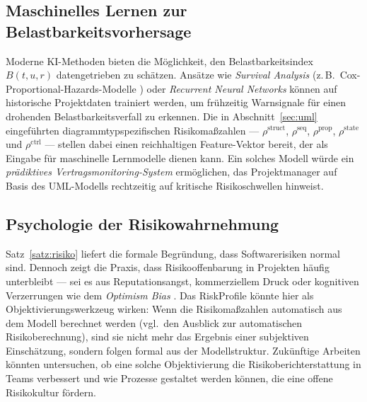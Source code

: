 ﻿\documentclass[a4paper,12pt]{article}
\theoremstyle{definition}
\begin{document}
\subsection{Maschinelles Lernen zur Belastbarkeitsvorhersage}

Moderne KI-Methoden bieten die M\"oglichkeit, den Belastbarkeitsindex $B(t, u, r)$
datengetrieben zu sch\"atzen. Ans\"atze wie \emph{Survival Analysis} (z.\,B.\
Cox-Proportional-Hazards-Modelle \cite{cox1972}) oder \emph{Recurrent Neural Networks}
k\"onnen auf historische Projektdaten trainiert werden, um fr\"uhzeitig Warnsignale
f\"ur einen drohenden Belastbarkeitsverfall zu erkennen. Die in Abschnitt~\ref{sec:uml}
eingef\"uhrten diagrammtypspezifischen Risikoma\ss{}zahlen ---
$\rho^{\mathrm{struct}}$, $\rho^{\mathrm{seq}}$, $\rho^{\mathrm{prop}}$,
$\rho^{\mathrm{state}}$ und $\rho^{\mathrm{ctrl}}$ --- stellen dabei einen
reichhaltigen Feature-Vektor bereit, der als Eingabe f\"ur maschinelle Lernmodelle
dienen kann. Ein solches Modell w\"urde ein
\emph{pr\"adiktives Vertragsmonitoring-System} erm\"oglichen, das Projektmanager
auf Basis des UML-Modells rechtzeitig auf kritische Risikoschwellen hinweist.

\subsection{Psychologie der Risikowahrnehmung}

Satz~\ref{satz:risiko} liefert die formale Begr\"undung, dass Softwarerisiken normal
sind. Dennoch zeigt die Praxis, dass Risikooffenbarung in Projekten h\"aufig unterbleibt
--- sei es aus Reputationsangst, kommerziellem Druck oder kognitiven Verzerrungen wie
dem \emph{Optimism Bias} \cite{weinstein1980}. Das \textsf{RiskProfile} k\"onnte hier
als Objektivierungswerkzeug wirken: Wenn die Risikoma\ss{}zahlen automatisch aus dem
Modell berechnet werden (vgl.\ den Ausblick zur automatischen Risikoberechnung), sind
sie nicht mehr das Ergebnis einer subjektiven Einsch\"atzung, sondern folgen formal aus
der Modellstruktur. Zuk\"unftige Arbeiten k\"onnten untersuchen, ob eine solche
Objektivierung die Risikoberichterstattung in Teams verbessert und wie Prozesse gestaltet
werden k\"onnen, die eine offene Risikokultur f\"ordern.
\end{document}
